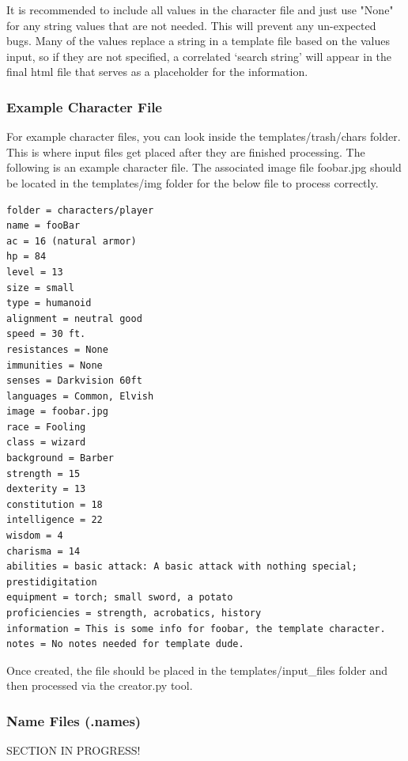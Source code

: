 It is recommended to include all values in the character file and just use "None" for any string values that are not needed. This will prevent any un-expected bugs. Many of the values replace a string in a template file based on the values input, so if they are not specified, a correlated `search string' will appear in the final html file that serves as a placeholder for the information.






\subsubsection{Example Character File}

For example character files, you can look inside the templates/trash/chars folder. This is where input files get placed after they are finished processing. The following is an example character file. The associated image file foobar.jpg should be located in the templates/img folder for the below file to process correctly.

\begin{lstlisting}
folder = characters/player
name = fooBar
ac = 16 (natural armor)
hp = 84
level = 13
size = small
type = humanoid
alignment = neutral good
speed = 30 ft.
resistances = None
immunities = None
senses = Darkvision 60ft
languages = Common, Elvish
image = foobar.jpg
race = Fooling
class = wizard
background = Barber
strength = 15
dexterity = 13
constitution = 18
intelligence = 22
wisdom = 4
charisma = 14
abilities = basic attack: A basic attack with nothing special; prestidigitation
equipment = torch; small sword, a potato
proficiencies = strength, acrobatics, history
information = This is some info for foobar, the template character.
notes = No notes needed for template dude.
\end{lstlisting}

Once created, the file should be placed in the templates/input\_files folder and then processed via the creator.py tool.










\subsubsection{Name Files (.names) \label{section .names}}

SECTION IN PROGRESS!








